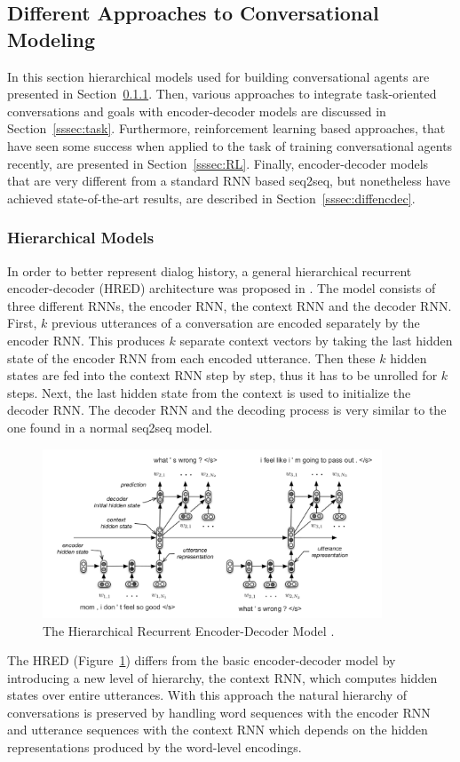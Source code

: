 \documentclass[12pt]{article}
\begin{document}
\subsection{Different Approaches to Conversational Modeling} \label{ssec:33}
In this section hierarchical models used for building conversational agents are presented in Section~\ref{sssec:HRED}. Then, various approaches to integrate task-oriented conversations and goals with encoder-decoder models are discussed in Section~\ref{sssec:task}. Furthermore, reinforcement learning based approaches, that have seen some success when applied to the task of training conversational agents recently, are presented in Section~\ref{sssec:RL}. Finally, encoder-decoder models that are very different from a standard RNN based seq2seq, but nonetheless have achieved state-of-the-art results, are described in Section~\ref{sssec:diffencdec}.

\subsubsection{Hierarchical Models} \label{sssec:HRED}
In order to better represent dialog history, a general hierarchical recurrent encoder-decoder (HRED) architecture was proposed in \cite{Serban:2015}. The model consists of three different RNNs, the encoder RNN, the context RNN and the decoder RNN. First, \(k\) previous utterances of a conversation are encoded separately by the encoder RNN. This produces \(k\) separate context vectors by taking the last hidden state of the encoder RNN from each encoded utterance. Then these \(k\) hidden states are fed into the context RNN step by step, thus it has to be unrolled for \(k\) steps. Next, the last hidden state from the context is used to initialize the decoder RNN. The decoder RNN and the decoding process is very similar to the one found in a normal seq2seq model.

\begin{figure}[H]
	\centering
	\includegraphics[width=0.9\textwidth]{pics/HRED.png}
	\caption{The Hierarchical Recurrent Encoder-Decoder Model \cite{Serban:2015}.}
	\label{fig:HRED}
\end{figure}
The HRED (Figure~\ref{fig:HRED}) differs from the basic encoder-decoder model by introducing a new level of hierarchy, the context RNN, which computes hidden states over entire utterances. With this approach the natural hierarchy of conversations is preserved by handling word sequences with the encoder RNN and utterance sequences with the context RNN which depends on the hidden representations produced by the word-level encodings.
\end{document}

